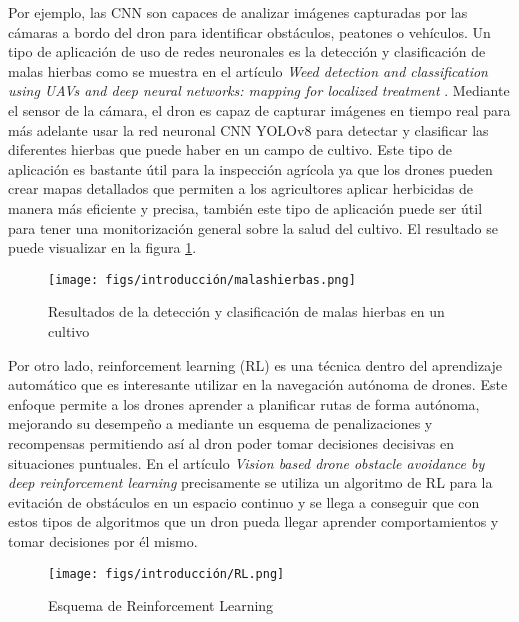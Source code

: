Por ejemplo, las CNN son capaces de analizar imágenes capturadas por las cámaras a bordo del dron para identificar obstáculos, 
peatones o vehículos. Un tipo de aplicación de uso de redes neuronales es la detección y clasificación de malas hierbas como se muestra 
en el artículo \textit{Weed detection and classification using UAVs and deep neural networks: mapping for localized treatment} \cite{CSIC}. Mediante el sensor de la cámara, el dron es capaz de capturar imágenes en tiempo real 
para más adelante usar la red neuronal CNN YOLOv8 \cite{Ultralytics_YOLOv8} para detectar y clasificar las diferentes hierbas que puede haber en un campo de cultivo. Este tipo de aplicación 
es bastante útil para la inspección
agrícola ya que los drones pueden crear mapas detallados que permiten a los agricultores aplicar herbicidas de manera más eficiente y precisa, también este tipo de aplicación puede
ser útil para tener una monitorización general sobre la salud del cultivo. El resultado se puede visualizar en la figura \ref{fig:malas hierbas}. 

\begin{figure} [H]
  \begin{center}
    \texttt{[image: figs/introducción/malashierbas.png]}
  \end{center}
  \caption{Resultados de la detección y clasificación de malas hierbas en un cultivo \cite{CSIC}}
  \label{fig:malas hierbas}
  \vspace{-1.5em}
\end{figure}

Por otro lado, reinforcement learning (RL) \cite{6025669} es una técnica dentro del aprendizaje automático que es interesante utilizar en la navegación autónoma de drones. Este enfoque permite
a los drones aprender a planificar rutas de forma autónoma, mejorando su desempeño a mediante un esquema de penalizaciones y recompensas permitiendo
así al dron poder tomar decisiones decisivas en situaciones puntuales. En el artículo \textit{Vision based drone obstacle avoidance by deep
reinforcement learning} \cite{ai2030023} precisamente se utiliza un algoritmo de RL para la evitación de obstáculos en un espacio continuo y se llega a conseguir que con estos
tipos de algoritmos que un dron pueda llegar aprender comportamientos y tomar decisiones por él mismo. 

\begin{figure} [H]
  \begin{center}
    \texttt{[image: figs/introducción/RL.png]}
  \end{center}
  \caption{Esquema de Reinforcement Learning \cite{BecomingHuman_RL_Basics}}
  \label{fig:Reinforcement Learning}
  \vspace{-1.5em}
\end{figure}

